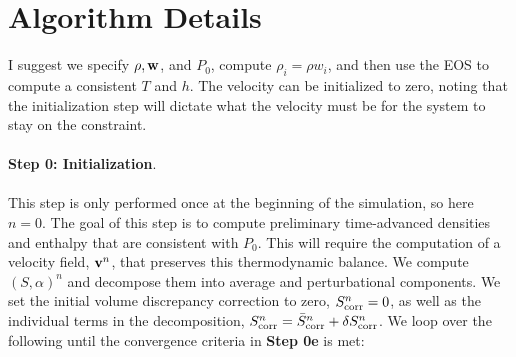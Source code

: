 \documentclass[final]{siamltex}
\def\vb {{\bf v}}
\def\wb {{\bf w}}
\begin{document}
\section{Algorithm Details}
I suggest we specify $\rho,\wb$, and $P_0$, compute $\rho_i = \rho w_i$,
and then use the EOS to compute a consistent
$T$ and $h$.  The velocity can be initialized to zero, noting that the
initialization step will dictate what the velocity must be for the system to stay
on the constraint.\\ \\
{\bf Step 0: Initialization}.\\ \\
This step is only performed once at the beginning of the simulation, so here $n=0$.
The goal of this step is to compute preliminary time-advanced densities and enthalpy
that are consistent with $P_0$.  This will
require the computation of a velocity field, $\vb^n$, that preserves this
thermodynamic balance.
We compute $(S,\alpha)^n$ and decompose them
into average and perturbational components.
We set the initial volume discrepancy correction to zero, 
$S_{\rm corr}^n = 0$, as well as the individual terms in the decomposition,
$S_{\rm corr}^n = \bar{S}_{\rm corr}^n + \delta S_{\rm corr}^n$.
We loop over the following until the convergence criteria in {\bf Step 0e} is met:\\
\end{document}
